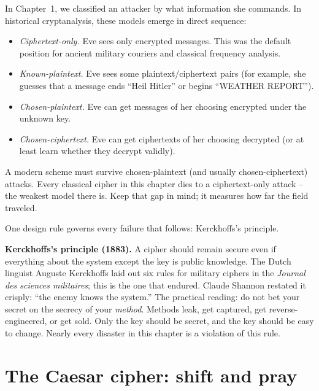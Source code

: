 \begin{definition}
\label{ch02:attack-models}
In Chapter~1, we classified an attacker by what information she commands. In historical cryptanalysis, these models emerge in direct sequence:
\begin{itemize}
  \item \emph{Ciphertext-only.} Eve sees only encrypted messages. This was the default position for ancient military couriers and classical frequency analysis.
  \item \emph{Known-plaintext.} Eve sees some plaintext/ciphertext pairs (for example, she guesses that a message ends ``Heil Hitler'' or begins ``WEATHER REPORT'').
  \item \emph{Chosen-plaintext.} Eve can get messages of her choosing encrypted under the unknown key.
  \item \emph{Chosen-ciphertext.} Eve can get ciphertexts of her choosing decrypted (or at least learn whether they decrypt validly).
\end{itemize}
\end{definition}

\begin{focusbox}
A modern scheme must survive chosen-plaintext (and usually chosen-ciphertext) attacks.
Every classical cipher in this chapter dies to a ciphertext-only attack -- the weakest model
there is. Keep that gap in mind; it measures how far the field traveled.
\end{focusbox}

One design rule governs every failure that follows: Kerckhoffs's principle.

\begin{formalbox}
\textbf{Kerckhoffs's principle (1883).} A cipher should remain secure even if everything
about the system except the key is public knowledge. The Dutch linguist Auguste Kerckhoffs
laid out six rules for military ciphers in the \emph{Journal des sciences militaires}; this
is the one that endured. Claude Shannon restated it crisply: ``the enemy knows the system.''
The practical reading: do not bet your secret on the secrecy of your \emph{method}. Methods
leak, get captured, get reverse-engineered, or get sold. Only the key should be secret, and
the key should be easy to change. Nearly every disaster in this chapter is a violation of
this rule.
\end{formalbox}

\section{The Caesar cipher: shift and pray}
\label{ch02:caesar}

